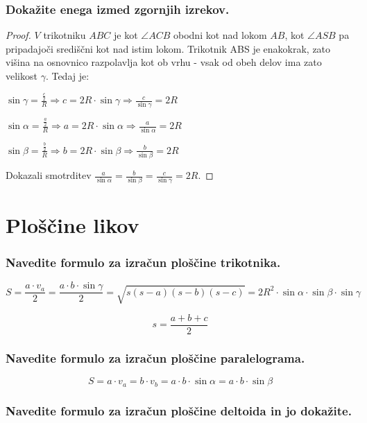 \documentclass{article}
\begin{document}

\subsubsection*{Dokažite enega izmed zgornjih izrekov.}

\begin{proof}
    $V$ trikotniku $A B C$ je kot $\angle A C B$ obodni kot nad lokom $A B$, kot $\angle A S B$ pa pripadajoči središčni kot nad istim lokom. Trikotnik ABS je enakokrak, zato višina na osnovnico razpolavlja kot ob vrhu - vsak od obeh delov ima zato velikost $\gamma$. Tedaj je:

$\sin \gamma=\frac{\frac{c}{2}}{R} \Rightarrow c=2 R \cdot \sin \gamma \Rightarrow \frac{c}{\sin \gamma}=2 R$

$\sin \alpha=\frac{\frac{a}{2}}{R} \Rightarrow a=2 R \cdot \sin \alpha \Rightarrow \frac{a}{\sin \alpha}=2 R$

$\sin \beta=\frac{\frac{b}{2}}{R} \Rightarrow b=2 R \cdot \sin \beta \Rightarrow \frac{b}{\sin \beta}=2 R$

Dokazali smotrditev $\frac{a}{\sin \alpha}=\frac{b}{\sin \beta}=\frac{c}{\sin \gamma}=2 R$.
\end{proof}

\section{Ploščine likov}
\subsubsection*{Navedite formulo za izračun ploščine trikotnika.}

$$
S=\frac{a \cdot v_{a}}{2}=\frac{a \cdot b \cdot \sin \gamma}{2}=\sqrt{s(s-a)(s-b)(s-c)}=2 R^{2} \cdot \sin \alpha \cdot \sin \beta \cdot \sin \gamma
$$

$$
s = \frac{a + b+ c}{2}
$$

\subsubsection*{Navedite formulo za izračun ploščine paralelograma.}

$$
S=a \cdot v_{a}=b \cdot v_{b}=a \cdot b \cdot \sin \alpha=a \cdot b \cdot \sin \beta
$$


\subsubsection*{Navedite formulo za izračun ploščine deltoida in jo dokažite.}
\end{document}
